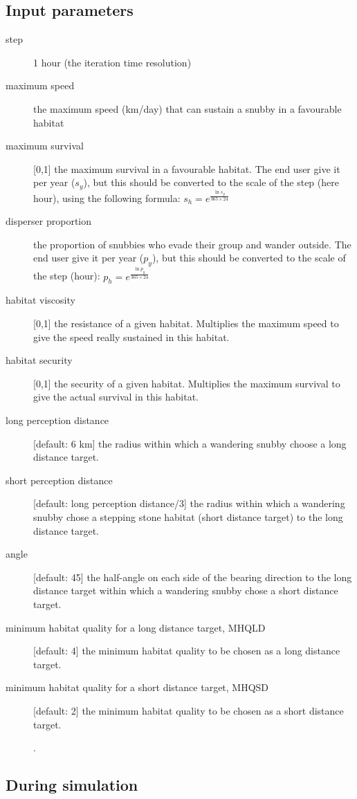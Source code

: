 \subsection{Input parameters}
\begin{description}
	\item[step] 1 hour (the iteration time resolution)
	\item[maximum speed] the maximum speed (km/day) that can sustain a snubby in a favourable habitat
	\item[maximum survival]  [0,1] the maximum survival in a favourable habitat. The end user give it per year ($s_y$), but this should be converted to the scale of the step (here hour), using the following formula: $s_h=e^{\frac{\ln{s_y}}{365\times24}}$
	\item[disperser proportion] the proportion of snubbies who evade their group and wander outside. The end user give it per year  ($p_y$), but this should be converted to the scale of the step (hour): $p_h=e^{\frac{\ln{p_y}}{365\times24}}$
	\item[habitat viscosity] [0,1] the resistance of a given habitat.  Multiplies the maximum speed to give the speed really sustained in this habitat.
	\item[habitat security] [0,1] the security of a given habitat.  Multiplies the maximum survival to give the actual survival in this habitat.
	\item[long perception distance] [default: 6 km] the radius within which a wandering snubby choose a long distance target.
	\item[short perception distance] [default: long perception distance/3] the radius within which a wandering snubby chose a stepping stone habitat (short distance target) to the long distance target.
	\item[angle] [default: 45\degree] the half-angle on each side of the bearing direction to the long distance target within which a wandering snubby chose a short distance target.
	\item[minimum habitat quality for a long distance target, MHQLD] [default: 4] the minimum habitat quality to be chosen as a long distance target.
	\item[minimum habitat quality for a short distance target, MHQSD]  [default: 2] the minimum habitat quality to be chosen as a short distance target.
	
.
\end{description}

\subsection{During simulation}

